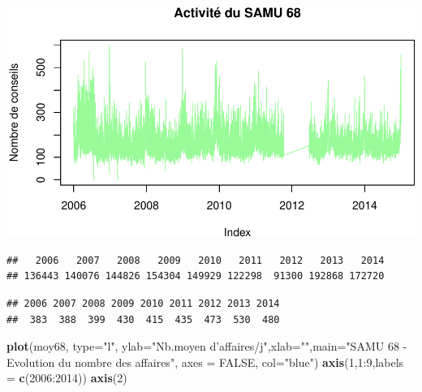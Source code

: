 \documentclass[]{article}
\newenvironment{Shaded}{\begin{snugshade}}{\end{snugshade}}
\newcommand{\KeywordTok}[1]{\textcolor[rgb]{0.13,0.29,0.53}{\textbf{{#1}}}}
\newcommand{\DataTypeTok}[1]{\textcolor[rgb]{0.13,0.29,0.53}{{#1}}}
\newcommand{\DecValTok}[1]{\textcolor[rgb]{0.00,0.00,0.81}{{#1}}}
\newcommand{\StringTok}[1]{\textcolor[rgb]{0.31,0.60,0.02}{{#1}}}
\newcommand{\CommentTok}[1]{\textcolor[rgb]{0.56,0.35,0.01}{\textit{{#1}}}}
\newcommand{\OtherTok}[1]{\textcolor[rgb]{0.56,0.35,0.01}{{#1}}}
\newcommand{\NormalTok}[1]{{#1}}
\begin{document}
\includegraphics{samu_files/figure-latex/samu68-2.pdf}

\begin{Shaded}
\end{Shaded}

\begin{verbatim}
##   2006   2007   2008   2009   2010   2011   2012   2013   2014 
## 136443 140076 144826 154304 149929 122298  91300 192868 172720
\end{verbatim}

\begin{Shaded}
\end{Shaded}

\begin{verbatim}
## 2006 2007 2008 2009 2010 2011 2012 2013 2014 
##  383  388  399  430  415  435  473  530  480
\end{verbatim}

\begin{Shaded}
\begin{Highlighting}[]
\KeywordTok{plot}\NormalTok{(moy68, }\DataTypeTok{type=}\StringTok{"l"}\NormalTok{, }\DataTypeTok{ylab=}\StringTok{"Nb.moyen d'affaires/j"}\NormalTok{,}\DataTypeTok{xlab=}\StringTok{""}\NormalTok{,}\DataTypeTok{main=}\StringTok{"SAMU 68 - Evolution du nombre des affaires"}\NormalTok{, }\DataTypeTok{axes =} \OtherTok{FALSE}\NormalTok{, }\DataTypeTok{col=}\StringTok{"blue"}\NormalTok{)}
\KeywordTok{axis}\NormalTok{(}\DecValTok{1}\NormalTok{,}\DecValTok{1}\NormalTok{:}\DecValTok{9}\NormalTok{,}\DataTypeTok{labels =} \KeywordTok{c}\NormalTok{(}\DecValTok{2006}\NormalTok{:}\DecValTok{2014}\NormalTok{))}
\KeywordTok{axis}\NormalTok{(}\DecValTok{2}\NormalTok{)}
\end{Highlighting}
\end{Shaded}
\end{document}
